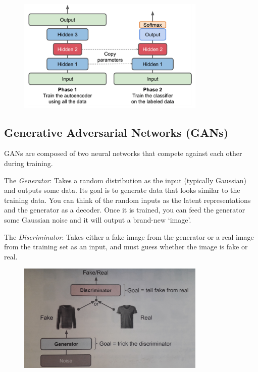 \begin{figure}[ht]
\centering
\includegraphics[width=0.80\textwidth]{./images/unsupervised_pretraining.png}
\end{figure}

\newpage
\subsection{Generative Adversarial Networks (GANs)}

GANs are composed of two neural networks that compete against each other during training.

The \textit{Generator}:\newline
Takes a random distribution as the input (typically Gaussian) and outputs some data.
Its goal is to generate data that looks similar to the training data.
You can think of the random inputs as the latent representations and the generator as a decoder.
Once it is trained, you can feed the generator some Gaussian noise and it will output a brand-new `image'.

The \textit{Discriminator}:\newline
Takes either a fake image from the generator or a real image from the training set as an input,
and must guess whether the image is fake or real.\newline

\begin{figure}[ht]
\centering
\includegraphics[width=0.80\textwidth]{./images/gan.jpg}
\end{figure}



\newpage